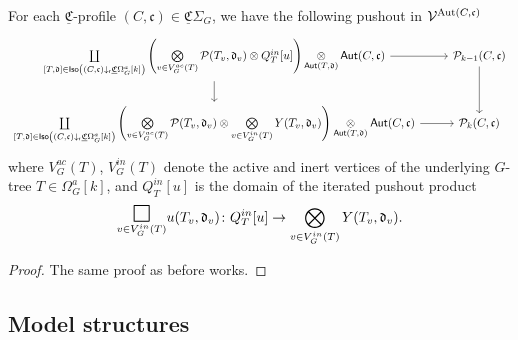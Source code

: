 \documentclass[a4paper,10pt
,draft
]{article}%
\newcommand{\UC}{\underline{\mathfrak C}}
\renewcommand{\1}{\ensuremath{\mathbb{id}}}
\begin{document}
\begin{proposition}
      [{cf. \cite[Prop 5.66]{BP17}}]
      For each $\UC$-profile $(C,\mathfrak c) \in \UC\Sigma_G$,
      we have the following pushout in $\mathcal V^{\mathrm{Aut}(C, \mathfrak c)}$
      \begin{equation}\label{FILTRATION_LAN_LEVEL}
            \begin{tikzcd}
                  \coprod\limits_{[T, \mathfrak d] \in \mathsf{Iso}
                    \left((C,\mathfrak c) \downarrow_{\mathsf{r}} \UC\Omega_G^a[k]\right)}
                  \left(
                        \bigotimes\limits_{v \in V_{G}^{ac}(T)}\P(T_v, \mathfrak d_v) \otimes
                        Q_T^{in}[u]
                  \right)
                  \mathop{\otimes}\limits_{\mathsf{Aut}(T, \mathfrak d)} \mathsf{Aut}(C, \mathfrak c)
                  \arrow[r] \arrow[d] &
                  \P_{k-1}(C, \mathfrak c) \arrow[d] 
                  \\
                  \coprod\limits_{[T, \mathfrak d] \in \mathsf{Iso}
                    \left((C, \mathfrak c) \downarrow_{\mathsf{r}} \UC\Omega_G^a[k]\right)}
                  \left(
                        \bigotimes\limits_{v \in V_{G}^{ac}(T)}\P(T_v, \mathfrak d_v) \otimes
                        \bigotimes\limits_{v \in V_{G}^{in}(T)} Y(T_v, \mathfrak d_v)
                  \right)
                  \underset{\mathsf{Aut}(T, \mathfrak d)}{\otimes} \mathsf{Aut}(C, \mathfrak c)
                  \arrow[r] &
                  \P_k(C, \mathfrak c)
            \end{tikzcd}
      \end{equation}
      where $ V_{G}^{ac}(T)$, $V_{G}^{in}(T)$ denote the active and inert vertices of the underlying $G$-tree $T \in \Omega_G^a[k]$,
      and $Q_T^{in}[u]$ is the domain 
      of the iterated pushout product
      \begin{equation}
            \underset{v \in V_G^{in}(T)}
            {\mathlarger{\mathlarger{\mathlarger{\square}}}}u(T_v, \mathfrak d_v)
            \colon
            Q_T^{in}[u] \to
            \bigotimes\limits_{v \in V_{G}^{in}(T)} Y(T_v, \mathfrak d_v).
      \end{equation}
\end{proposition}
\begin{proof}
      The same proof as before works.
\end{proof}

\subsection{Model structures}
\end{document}
